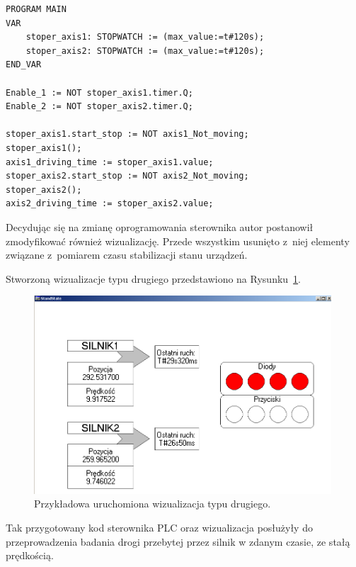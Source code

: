 \vspace{5mm}
\begin{lstlisting}[caption={Oprogramowanie odmierzające drogę przebytą w zadanym czasie.},label=servoDist]
PROGRAM MAIN
VAR
	stoper_axis1: STOPWATCH := (max_value:=t#120s);
	stoper_axis2: STOPWATCH := (max_value:=t#120s);
END_VAR

Enable_1 := NOT stoper_axis1.timer.Q;
Enable_2 := NOT stoper_axis2.timer.Q;

stoper_axis1.start_stop := NOT axis1_Not_moving;
stoper_axis1();
axis1_driving_time := stoper_axis1.value;
stoper_axis2.start_stop := NOT axis2_Not_moving;
stoper_axis2();
axis2_driving_time := stoper_axis2.value;
\end{lstlisting}

\clearpage
Decydując się na zmianę oprogramowania sterownika autor postanowił zmodyfikować również wizualizację. Przede wszystkim usunięto z~niej elementy związane z~pomiarem czasu stabilizacji stanu urządzeń.

Stworzoną wizualizacje typu drugiego przedstawiono na Rysunku~\ref{vis2_inuse}.
\begin{figure}[!htb] 	\centering 	\includegraphics[width=0.99\textwidth]{images/vis2_inuse} \caption{Przykładowa uruchomiona wizualizacja typu drugiego.} \label{vis2_inuse} \end{figure}

\noindent Tak przygotowany kod sterownika PLC oraz wizualizacja posłużyły do przeprowadzenia badania drogi przebytej przez silnik w zdanym czasie, ze stałą prędkością. 
%
%

